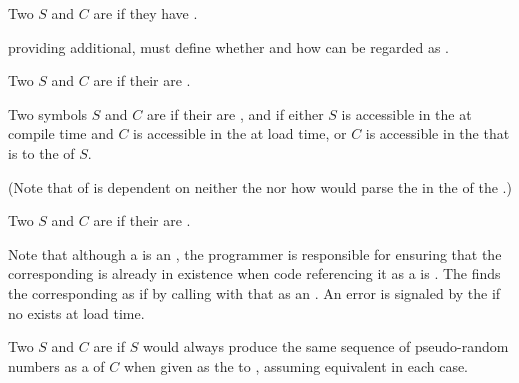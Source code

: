 Two   $S$ and $C$ are  
if they have   .

 providing additional,  
 must define whether and how   
can be regarded as .


Two   $S$ and $C$ are 
if their  are .

Two  symbols $S$ and $C$ are  
if their  are ,
and if either $S$ is accessible in the  at compile time
          and $C$ is accessible in the  at load time,
       or $C$ is accessible in the  that is  to
          the  of $S$.

(Note that  of   is dependent
on neither the  nor how  would
parse the  in the  of the .)


Two  $S$ and $C$ are  if their  are .

Note that although a   is an ,
the programmer is responsible for ensuring that the corresponding  is
already in existence when code referencing it as a   
is .  The  finds the corresponding  
as if by calling  with that  as an .
An error is signaled by the  if no  exists at load time.

 
Two  $S$ and $C$ are  if $S$
would always produce the same sequence of pseudo-random numbers 
as a  of $C$
when given as the   to , 
assuming equivalent   in each case.

